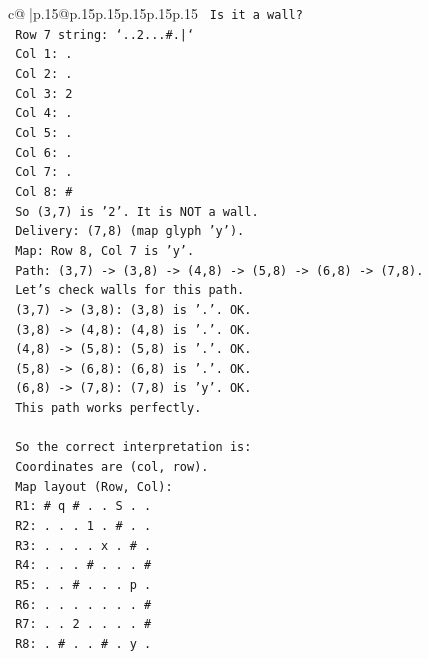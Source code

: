 \documentclass{article}
\begin{document}
{\begin{supertabular}{c@{$\;$}|p{.15\linewidth}@{}p{.15\linewidth}p{.15\linewidth}p{.15\linewidth}p{.15\linewidth}p{.15\linewidth}}
{{{\texttt{   Is it a wall?} \\
\texttt{   Row 7 string: `..2...\#.|`} \\
\texttt{   Col 1: .} \\
\texttt{   Col 2: .} \\
\texttt{   Col 3: 2} \\
\texttt{   Col 4: .} \\
\texttt{   Col 5: .} \\
\texttt{   Col 6: .} \\
\texttt{   Col 7: .} \\
\texttt{   Col 8: \#} \\
\texttt{   So (3,7) is '2'. It is NOT a wall.} \\
\texttt{   Delivery: (7,8) (map glyph 'y').} \\
\texttt{   Map: Row 8, Col 7 is 'y'.} \\
\texttt{   Path: (3,7) {-}> (3,8) {-}> (4,8) {-}> (5,8) {-}> (6,8) {-}> (7,8).} \\
\texttt{   Let's check walls for this path.} \\
\texttt{   (3,7) {-}> (3,8): (3,8) is '.'. OK.} \\
\texttt{   (3,8) {-}> (4,8): (4,8) is '.'. OK.} \\
\texttt{   (4,8) {-}> (5,8): (5,8) is '.'. OK.} \\
\texttt{   (5,8) {-}> (6,8): (6,8) is '.'. OK.} \\
\texttt{   (6,8) {-}> (7,8): (7,8) is 'y'. OK.} \\
\texttt{   This path works perfectly.} \\
\\ 
\texttt{   So the correct interpretation is:} \\
\texttt{   Coordinates are (col, row).} \\
\texttt{   Map layout (Row, Col):} \\
\texttt{   R1: \# q \# . . S . .} \\
\texttt{   R2: . . . 1 . \# . .} \\
\texttt{   R3: . . . . x . \# .} \\
\texttt{   R4: . . . \# . . . \#} \\
\texttt{   R5: . . \# . . . p .} \\
\texttt{   R6: . . . . . . . \#} \\
\texttt{   R7: . . 2 . . . . \#} \\
\texttt{   R8: . \# . . \# . y .} \\
\\ 
}}}
\end{supertabular}}
\end{document}
